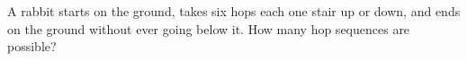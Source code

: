 A rabbit starts on the ground, takes six hops each one stair up or down, and ends on the ground without ever going below it. How many hop sequences are possible?
